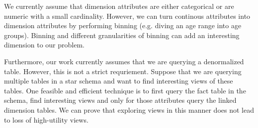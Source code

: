  We currently assume that dimension attributes are either categorical or are
 numeric with a small cardinality.
 However, we can turn continous attributes into dimension attributes by
 performing binning (e.g. diving an age range into age groups).
 Binning and different granularities of binning can add an interesting dimension
 to our problem.
 
 Furthermore, our work currently assumes that we are querying a denormalized
 table.
 However, this is not a strict requriement. 
 Suppose that we are querying multiple tables in a star schema and want to find
 interesting views of these tables.
 One feasible and efficient technique is to first query the fact table in the
 schema, find interesting views and only for those attributes query the
 linked dimension tables.
 We can prove that exploring views in this manner does not lead to loss of
 high-utility views.
